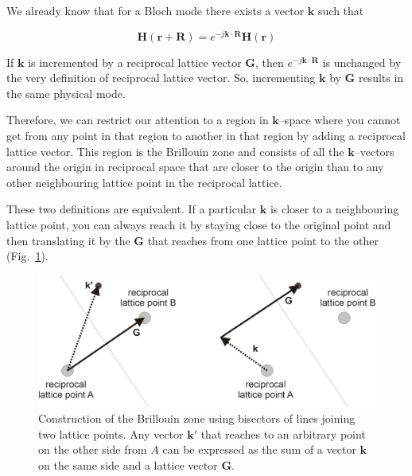 \pagebreak


We already know that for a Bloch mode there exists a vector ${\mathbf k}$ such that

\begin{equation}
{\mathbf H} ({\mathbf r}+ {\mathbf R}) = e^{-j {\mathbf k} \cdot {\mathbf R}} {\mathbf H} ({\mathbf r})
\end{equation} 

If ${\mathbf k}$ is incremented by a reciprocal lattice vector ${\mathbf G}$, then $e^{-j {\mathbf k} \cdot {\mathbf R}}$ is unchanged by the very definition of reciprocal lattice vector. So, incrementing ${\mathbf k}$ by ${\mathbf G}$ results in the same physical mode.

Therefore, we can restrict our attention to a region in ${\mathbf k}$--space where you cannot get from any point in that region to another in that region by adding a reciprocal lattice vector. This region is the Brillouin zone and consists of all the ${\mathbf k}$--vectors around the origin in reciprocal space that are closer to the origin than to any other neighbouring lattice point in the reciprocal lattice.

These two definitions are equivalent. If a particular ${\mathbf k}$ is closer to a neighbouring lattice point, you can always reach it by staying close to the original point and then translating it by the ${\mathbf G}$ that reaches from one lattice point to the other (Fig.~\ref{fig-bril-bisector}).

\begin{figure}
\centering
\includegraphics{symmetry/figures/bisector}
\caption{Construction of the Brillouin zone using bisectors of lines joining two lattice points. Any vector ${\mathbf k}'$ that reaches to an arbitrary point on the other side from $A$ can be expressed as the sum of a vector ${\mathbf k}$ on the same side and a lattice vector ${\mathbf G}$.}
\label{fig-bril-bisector}
\end{figure}

